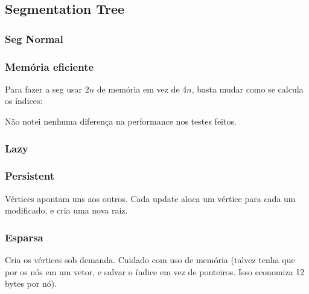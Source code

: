 \subsection{Segmentation Tree}

\subsubsection{Seg Normal}


\subsubsection{Memória eficiente}

Para fazer a seg usar $2n$ de memória em vez de $4n$, basta mudar como se calcula os índices:


Não notei nenhuma diferença na performance nos testes feitos.

\subsubsection{Lazy}


\subsubsection{Persistent}

Vértices apontam uns aos outros. Cada update aloca um vértice para cada um modificado, e cria uma nova raiz.


\subsubsection{Esparsa}

Cria os vértices sob demanda. Cuidado com uso de memória (talvez tenha que por os nós em um vetor, e salvar o índice em vez de ponteiros. Isso economiza 12 bytes por nó).


